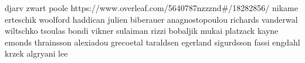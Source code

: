 djarv
zwart
poole  https://www.overleaf.com/5640787nzzznd#/18282856/
nikame
erteschik
woolford
haddican
julien
biberauer
anagnostopoulou
richards
vanderwal
wiltschko
tsoulas
bondi
vikner
sulaiman
rizzi
bobaljik
mukai
platzack
kayne
emonds
thrainsson
alexiadou
grecoetal
taraldsen
egerland
sigurdsson
fassi
engdahl
krzek
algryani
lee

